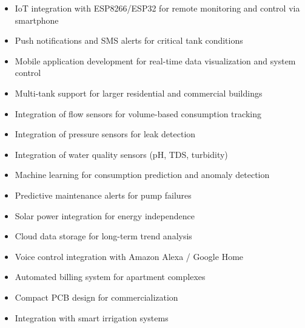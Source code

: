 \documentclass[12pt,a4paper]{article}
\begin{document}
\begin{itemize}
     

\item IoT integration with ESP8266/ESP32 for remote monitoring and control via smartphone

\item Push notifications and SMS alerts for critical tank conditions

\item Mobile application development for real-time data visualization and system control

\item Multi-tank support for larger residential and commercial buildings

\item Integration of flow sensors for volume-based consumption tracking

\item Integration of pressure sensors for leak detection

\item Integration of water quality sensors (pH, TDS, turbidity)

\item Machine learning for consumption prediction and anomaly detection

\item Predictive maintenance alerts for pump failures

\item Solar power integration for energy independence

\item Cloud data storage for long-term trend analysis

\item Voice control integration with Amazon Alexa / Google Home

\item Automated billing system for apartment complexes

\item Compact PCB design for commercialization

\item Integration with smart irrigation systems

\end{itemize}

\newpage

\end{document}
